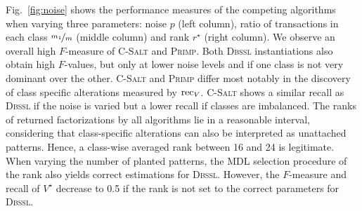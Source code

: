 Fig.~\ref{fig:noise} shows the performance measures of the competing algorithms when varying three parameters: noise $p$ (left column), ratio of transactions in each class $\nicefrac{m_1}{m}$ (middle column) and rank $r^\star$ (right column).
We observe an overall high $F$-measure of \textsc{C-Salt} and \textsc{Primp}.
Both \textsc{Dbssl} instantiations also obtain high $F$-values, but only at lower noise levels and if one class is not very dominant over the other.
\textsc{C-Salt} and \textsc{Primp} differ most notably in the discovery of class specific alterations measured by $\operatorname*{rec}_V$. \textsc{C-Salt} shows a similar recall as \textsc{Dbssl} if the noise is varied but a lower recall if classes are imbalanced. The ranks of returned factorizations by all algorithms lie in a reasonable interval, considering that class-specific alterations can also be interpreted as unattached patterns. Hence, a class-wise averaged rank between 16 and 24 is legitimate. When varying the number of planted patterns, the MDL selection procedure of the rank also yields correct estimations for \textsc{Dbssl}. However, the $F$-measure and recall of $V^\star$ decrease to 0.5 if the rank is not set to the correct parameters for \textsc{Dbssl}.

